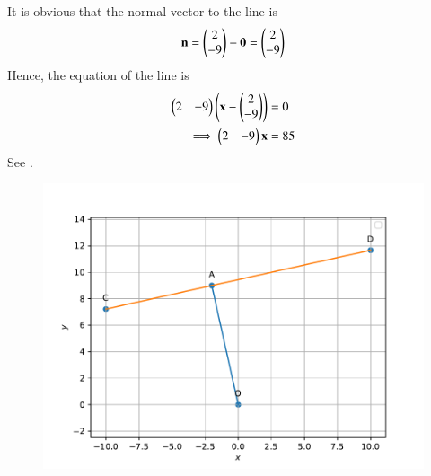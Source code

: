 It is obvious that the normal vector to the line is 
\begin{align}
\mathbf{n} =\begin{pmatrix}2 \\ -9\end{pmatrix} -\mathbf{0} 
=\begin{pmatrix}2 \\ -9\end{pmatrix}
\end{align}
Hence, the equation of the line is 
\begin{align}
	\begin{pmatrix}2 & -9\end{pmatrix}\left(\mathbf{x} - \begin{pmatrix}2 \\ -9\end{pmatrix}\right)&= 0
	\\
	\implies 
	\begin{pmatrix}2 & -9\end{pmatrix}\mathbf{x} &= 85
\end{align}
See 
		.
	\begin{figure}[!ht]
		\centering
 \includegraphics[width=\columnwidth]{chapters/11/10/2/15/figs/line.pdf}
		\caption{}
		\label{fig:11/10/2/15}
  	\end{figure}
